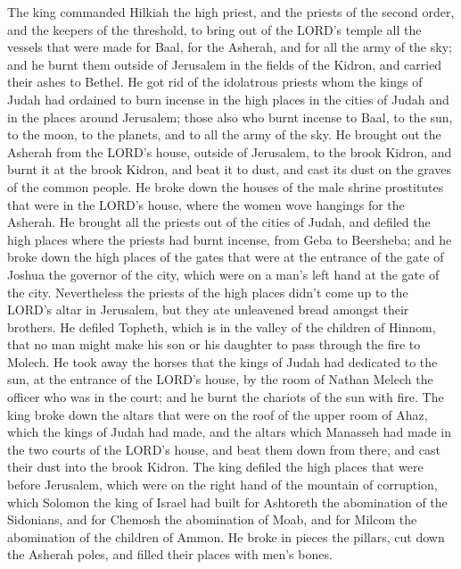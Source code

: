  The king commanded Hilkiah the high priest, and the priests
of the second order, and the keepers of the threshold, to bring out of
the LORD's temple all the vessels that were made for Baal, for the
Asherah, and for all the army of the sky; and he burnt them outside of
Jerusalem in the fields of the Kidron, and carried their ashes to
Bethel.  He got rid of the idolatrous priests whom the kings
of Judah had ordained to burn incense in the high places in the cities
of Judah and in the places around Jerusalem; those also who burnt
incense to Baal, to the sun, to the moon, to the planets, and to all the
army of the sky.  He brought out the Asherah from the LORD's
house, outside of Jerusalem, to the brook Kidron, and burnt it at the
brook Kidron, and beat it to dust, and cast its dust on the graves of
the common people.  He broke down the houses of the male
shrine prostitutes that were in the LORD's house, where the women wove
hangings for the Asherah.  He brought all the priests out of
the cities of Judah, and defiled the high places where the priests had
burnt incense, from Geba to Beersheba; and he broke down the high places
of the gates that were at the entrance of the gate of Joshua the
governor of the city, which were on a man's left hand at the gate of the
city.  Nevertheless the priests of the high places didn't
come up to the LORD's altar in Jerusalem, but they ate unleavened bread
amongst their brothers.  He defiled Topheth, which is in
the valley of the children of Hinnom, that no man might make his son or
his daughter to pass through the fire to Molech.  He took
away the horses that the kings of Judah had dedicated to the sun, at the
entrance of the LORD's house, by the room of Nathan Melech the officer
who was in the court; and he burnt the chariots of the sun with fire.
 The king broke down the altars that were on the roof of
the upper room of Ahaz, which the kings of Judah had made, and the
altars which Manasseh had made in the two courts of the LORD's house,
and beat them down from there, and cast their dust into the brook
Kidron.  The king defiled the high places that were before
Jerusalem, which were on the right hand of the mountain of corruption,
which Solomon the king of Israel had built for Ashtoreth the abomination
of the Sidonians, and for Chemosh the abomination of Moab, and for
Milcom the abomination of the children of Ammon.  He broke
in pieces the pillars, cut down the Asherah poles, and filled their
places with men's bones.

